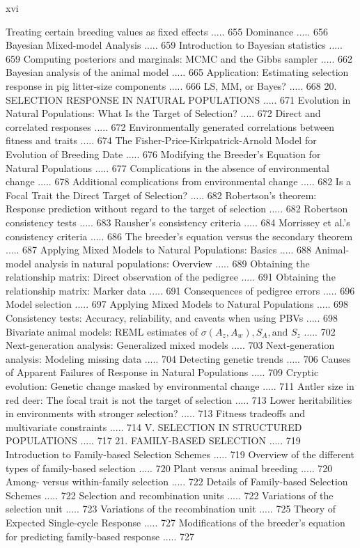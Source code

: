 \documentclass{article}
\begin{document}
xvi

Treating certain breeding values as fixed effects ..... 655
Dominance ..... 656
Bayesian Mixed-model Analysis ..... 659
Introduction to Bayesian statistics ..... 659
Computing posteriors and marginals: MCMC and the Gibbs sampler ..... 662
Bayesian analysis of the animal model ..... 665
Application: Estimating selection response in pig litter-size components ..... 666
LS, MM, or Bayes? ..... 668
20. SELECTION RESPONSE IN NATURAL POPULATIONS ..... 671
Evolution in Natural Populations: What Is the Target of Selection? ..... 672
Direct and correlated responses ..... 672
Environmentally generated correlations between fitness and traits ..... 674
The Fisher-Price-Kirkpatrick-Arnold Model for Evolution of Breeding Date ..... 676
Modifying the Breeder's Equation for Natural Populations ..... 677
Complications in the absence of environmental change ..... 678
Additional complications from environmental change ..... 682
Is a Focal Trait the Direct Target of Selection? ..... 682
Robertson's theorem: Response prediction without regard to the target of selection ..... 682
Robertson consistency tests ..... 683
Rausher's consistency criteria ..... 684
Morrissey et al.'s consistency criteria ..... 686
The breeder's equation versus the secondary theorem ..... 687
Applying Mixed Models to Natural Populations: Basics ..... 688
Animal-model analysis in natural populations: Overview ..... 689
Obtaining the relationship matrix: Direct observation of the pedigree ..... 691
Obtaining the relationship matrix: Marker data ..... 691
Consequences of pedigree errors ..... 696
Model selection ..... 697
Applying Mixed Models to Natural Populations ..... 698
Consistency tests: Accuracy, reliability, and caveats when using PBVs ..... 698
Bivariate animal models: REML estimates of  $ \sigma(A_{z}, A_{w}), S_{A}, \text{and } S_{z} $ ..... 702
Next-generation analysis: Generalized mixed models ..... 703
Next-generation analysis: Modeling missing data ..... 704
Detecting genetic trends ..... 706
Causes of Apparent Failures of Response in Natural Populations ..... 709
Cryptic evolution: Genetic change masked by environmental change ..... 711
Antler size in red deer: The focal trait is not the target of selection ..... 713
Lower heritabilities in environments with stronger selection? ..... 713
Fitness tradeoffs and multivariate constraints ..... 714
V. SELECTION IN STRUCTURED POPULATIONS ..... 717
21. FAMILY-BASED SELECTION ..... 719
Introduction to Family-based Selection Schemes ..... 719
Overview of the different types of family-based selection ..... 720
Plant versus animal breeding ..... 720
Among- versus within-family selection ..... 722
Details of Family-based Selection Schemes ..... 722
Selection and recombination units ..... 722
Variations of the selection unit ..... 723
Variations of the recombination unit ..... 725
Theory of Expected Single-cycle Response ..... 727
Modifications of the breeder's equation for predicting family-based response ..... 727
\end{document}
